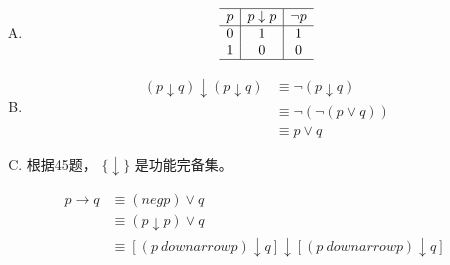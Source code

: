 {{        %
        \begin{practices}
            \begin{enumerate}[A.]
                \item
                {
                    \begin{table}[H]
                        \[
                            \begin{array}{c|c|c}
                                \hline
                                p & p \downarrow p & \neg p \\
                                \hline
                                0 & 1 & 1 \\
                                1 & 0 & 0 \\
                                \hline
                           \end{array}
                       \]
                    \end{table}
                }
                \item
                {
                    \begin{align*}
                        (p \downarrow q) \downarrow (p \downarrow q)
                        &\equiv \neg (p \downarrow q) \\
                        &\equiv \neg (\neg (p \vee q)) \\
                        &\equiv p \vee q
                    \end{align*}
                }
                \item
                {
                    根据45题， $\{\downarrow\}$ 是功能完备集。
                }
            \end{enumerate}
        \end{practices}

        \begin{practices}
            \begin{align*}
                p \rightarrow q
                &\equiv (neg p) \vee q \\
                &\equiv (p \downarrow p) \vee q \\
                &\equiv [(p\ downarrow p) \downarrow q] \downarrow [(p\ downarrow p) \downarrow q]
            \end{align*}
        \end{practices}

}}
